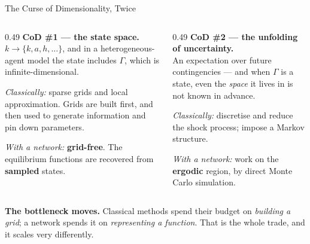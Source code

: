 \begin{frame}{The Curse of Dimensionality, Twice}
\begin{columns}[T]
\begin{column}{0.49\textwidth}
\small
\textbf{CoD \#1 --- the state space.}\\
$k\rightarrow\{k,a,h,\dots\}$, and in a heterogeneous-agent model the state includes $\Gamma$, which is infinite-dimensional.
\medskip

\emph{Classically:} sparse grids and local approximation. Grids are built first, and then used to generate information and pin down parameters.
\medskip

\emph{With a network:} \textbf{grid-free}. The equilibrium functions are recovered from \textbf{sampled} states.
\end{column}
\begin{column}{0.49\textwidth}
\small
\textbf{CoD \#2 --- the unfolding of uncertainty.}\\
An expectation over future contingencies --- and when $\Gamma$ is a state, even the \emph{space} it lives in is not known in advance.
\medskip

\emph{Classically:} discretise and reduce the shock process; impose a Markov structure.
\medskip

\emph{With a network:} work on the \textbf{ergodic} region, by direct Monte Carlo simulation.
\end{column}
\end{columns}
\medskip
\begin{takeawaybox}\footnotesize
\textbf{The bottleneck moves.} Classical methods spend their budget on \emph{building a grid}; a network spends it on \emph{representing a function}. That is the whole trade, and it scales very differently.
\end{takeawaybox}
\end{frame}

